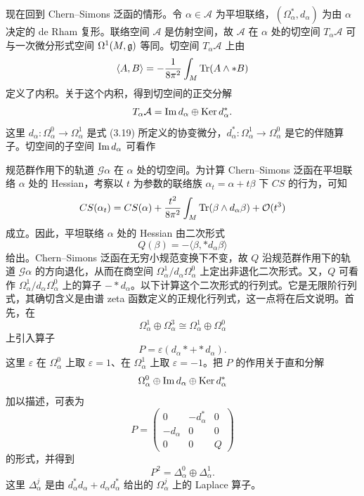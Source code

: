
现在回到 Chern--Simons 泛函的情形。令 $\alpha\in\mathcal{A}$ 为平坦联络，$(\Omega^{*}_{\alpha},d_{\alpha})$ 为由 $\alpha$ 决定的 de Rham 复形。联络空间 $\mathcal{A}$ 是仿射空间，故 $\mathcal{A}$ 在 $\alpha$ 处的切空间 $T_{\alpha}\mathcal{A}$ 可与一次微分形式空间 $\Omega^{1}(M,\mathfrak{g})$ 等同。切空间 $T_{\alpha}\mathcal{A}$ 上由
\[
  \langle A,B\rangle=-\frac{1}{8\pi^{2}}\int_{M}\operatorname{Tr}(A\wedge*B)
\]
定义了内积。关于这个内积，得到切空间的正交分解
\[
  T_{\alpha}\mathcal{A}=\operatorname{Im} d_{\alpha}\oplus\operatorname{Ker} d^{*}_{\alpha} .
\]
这里 $d_{\alpha}\colon\Omega^{0}_{\alpha}\to\Omega^{1}_{\alpha}$ 是式 (3.19) 所定义的协变微分，$d^{*}_{\alpha}\colon\Omega^{1}_{\alpha}\to\Omega^{0}_{\alpha}$ 是它的伴随算子。切空间的子空间 $\operatorname{Im} d_{\alpha}$ 可看作

规范群作用下的轨道 $\mathcal{G}\alpha$ 在 $\alpha$ 处的切空间。为计算 Chern--Simons 泛函在平坦联络 $\alpha$ 处的 Hessian，考察以 $t$ 为参数的联络族 $\alpha_{t}=\alpha+t\beta$ 下 $CS$ 的行为，可知
\[
  CS(\alpha_{t})=CS(\alpha)+\frac{t^{2}}{8\pi^{2}}\int_{M}\operatorname{Tr}(\beta\wedge d_{\alpha}\beta)
  +\mathcal{O}(t^{3})
\]
成立。因此，平坦联络 $\alpha$ 处的 Hessian 由二次形式
\[
  Q(\beta)=-\langle\beta,*d_{\alpha}\beta\rangle
\]
给出。Chern--Simons 泛函在无穷小规范变换下不变，故 $Q$ 沿规范群作用下的轨道 $\mathcal{G}\alpha$ 的方向退化，从而在商空间 $\Omega^{1}_{\alpha}/d_{\alpha}\Omega^{0}_{\alpha}$ 上定出非退化二次形式。又，$Q$ 可看作 $\Omega^{1}_{\alpha}/d_{\alpha}\Omega^{0}_{\alpha}$ 上的算子 $-*d_{\alpha}$。以下计算这个二次形式的行列式。它是无限阶行列式，其确切含义是由谱 zeta 函数定义的正规化行列式，这一点将在后文说明。首先，在
\[
  \Omega^{1}_{\alpha}\oplus\Omega^{3}_{\alpha}\cong\Omega^{1}_{\alpha}\oplus\Omega^{0}_{\alpha}
\]
上引入算子
\[
  P=\varepsilon(d_{\alpha}*+*d_{\alpha}) .
\]
这里 $\varepsilon$ 在 $\Omega^{0}_{\alpha}$ 上取 $\varepsilon=1$、在 $\Omega^{1}_{\alpha}$ 上取 $\varepsilon=-1$。把 $P$ 的作用关于直和分解
\[
  \Omega^{0}_{\alpha}\oplus\operatorname{Im} d_{\alpha}\oplus\operatorname{Ker} d^{*}_{\alpha}
\]
加以描述，可表为
\begin{equation}
  P=
  \begin{pmatrix}
    0 & -d^{*}_{\alpha} & 0\\
    -d_{\alpha} & 0 & 0\\
    0 & 0 & Q
  \end{pmatrix}
  \tag{3.23}
\end{equation}
的形式，并得到
\begin{equation}
  P^{2}=\Delta^{0}_{\alpha}\oplus\Delta^{1}_{\alpha} .
  \tag{3.24}
\end{equation}
这里 $\Delta^{j}_{\alpha}$ 是由 $d^{*}_{\alpha}d_{\alpha}+d_{\alpha}d^{*}_{\alpha}$ 给出的 $\Omega^{j}_{\alpha}$ 上的 Laplace 算子。

